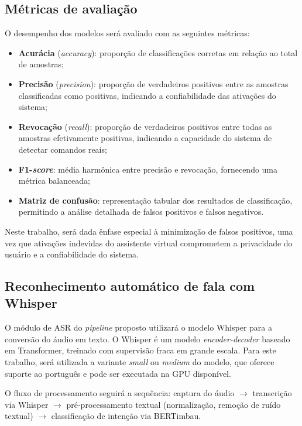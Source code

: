 \documentclass[
    12pt,                %
    openright,           %
    oneside,             %
    a4paper,             %
    english,             %
    brazil               %
]{abntex2}
\begin{document}
\subsection{Métricas de avaliação}

O desempenho dos modelos será avaliado com as seguintes métricas:

\begin{itemize}
    \item \textbf{Acurácia} (\textit{accuracy}): proporção de classificações corretas em relação ao total de amostras;
    \item \textbf{Precisão} (\textit{precision}): proporção de verdadeiros positivos entre as amostras classificadas como positivas, indicando a confiabilidade das ativações do sistema;
    \item \textbf{Revocação} (\textit{recall}): proporção de verdadeiros positivos entre todas as amostras efetivamente positivas, indicando a capacidade do sistema de detectar comandos reais;
    \item \textbf{F1-\textit{score}}: média harmônica entre precisão e revocação, fornecendo uma métrica balanceada;
    \item \textbf{Matriz de confusão}: representação tabular dos resultados de classificação, permitindo a análise detalhada de falsos positivos e falsos negativos.
\end{itemize}

Neste trabalho, será dada ênfase especial à minimização de falsos positivos, uma vez que ativações indevidas do assistente virtual comprometem a privacidade do usuário e a confiabilidade do sistema.

\subsection{Reconhecimento automático de fala com Whisper}

O módulo de ASR do \textit{pipeline} proposto utilizará o modelo Whisper \cite{Radford2023} para a conversão do áudio em texto. O Whisper é um modelo \textit{encoder-decoder} baseado em Transformer, treinado com supervisão fraca em grande escala. Para este trabalho, será utilizada a variante \textit{small} ou \textit{medium} do modelo, que oferece suporte ao português e pode ser executada na GPU disponível.

O fluxo de processamento seguirá a sequência: captura do áudio $\rightarrow$ transcrição via Whisper $\rightarrow$ pré-processamento textual (normalização, remoção de ruído textual) $\rightarrow$ classificação de intenção via BERTimbau.
\end{document}
